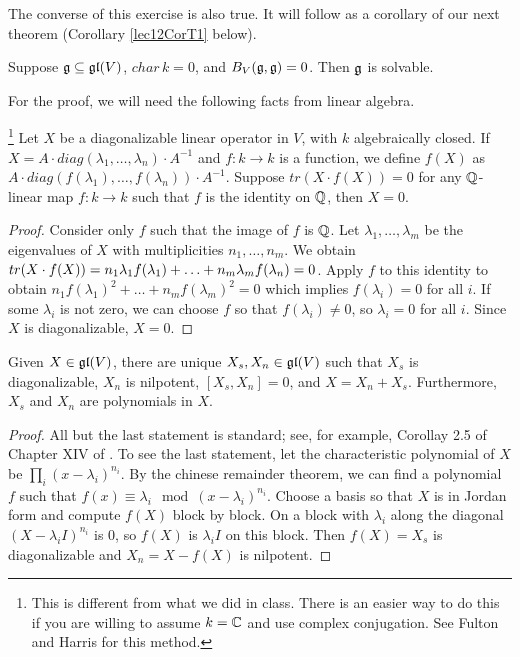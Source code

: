  The converse of this exercise is also true.  It will follow as a corollary
 of our next theorem (Corollary \ref{lec12CorT1} below).
 \begin{theorem}\label{lec12T1}
   Suppose $\mathfrak{g}\subseteq \mathfrak{gl}(V)$, $char\, k=0$, and $B_V(\mathfrak{g},\mathfrak{g})=0$. Then $\mathfrak{g}$ is solvable.
 \end{theorem}
 For the proof, we will need the following facts from linear algebra.
 \begin{lemma}\label{lec12L1}\hspace*{-1em}
   \footnote{This is different from what we did in class.  There is an easier way
   to do this if you are willing to assume $k = \mathbb{C}$ and use complex conjugation.  See
   Fulton and Harris for this method.} Let $X$ be a diagonalizable linear operator in
   $V$, with $k$ algebraically closed. If $X=A\cdot diag(\lambda_1,\dots,
   \lambda_n)\cdot A^{-1}$ and $f:k\to k$ is a function, we define $f(X)$ as $A\cdot
   diag(f(\lambda_1),\dots, f(\lambda_n))\cdot A^{-1}$. Suppose $tr (X \cdot f(X))=0$
   for any $\mathbb{Q}$-linear map $f:k \rightarrow k$ such that $f$ is the identity on
   $\mathbb{Q}$, then $X=0$.
 \end{lemma}
 \begin{proof}
   Consider only $f$ such that the image of $f$ is $\mathbb{Q}$. Let
   $\lambda_1,\dots, \lambda_m$ be the eigenvalues of $X$ with multiplicities
   $n_1,\dots, n_m$.  We obtain $tr(X\cdot\nobreak f(X)) = n_1 \lambda_1 f(\lambda_1)+\ldots
   +n_m \lambda_m f(\lambda_n)=0$. Apply $f$ to this identity to obtain $n_1
   f(\lambda_1)^2+\ldots+n_m f(\lambda_m)^2=0$ which implies $f(\lambda_i)=0$ for all
   $i$. If some $\lambda_i$ is not zero, we can choose $f$ so that $f(\lambda_i) \neq
   0$, so $\lambda_i=0$ for all $i$. Since $X$ is diagonalizable, $X=0$.
 \end{proof}

 \begin{lemma}\label{lec12Ljordan}
   Given $X\in \mathfrak{gl}(V)$, there are unique $X_s, X_n\in \mathfrak{gl}(V)$ such that $X_s$ is
   diagonalizable, $X_n$ is nilpotent, $[X_s,X_n]=0$, and $X=X_n+X_s$.  Furthermore,
   $X_s$ and $X_n$ are polynomials in $X$.
 \end{lemma}
 \begin{proof}
   All but the last statement is standard; see, for example, Corollay 2.5 of Chapter
   XIV of \cite{Lang:Algebra}. To see the last statement, let the characteristic
   polynomial of $X$ be $\prod_i(x-\lambda_i)^{n_i}$. By the chinese remainder
   theorem, we can find a polynomial $f$ such that $f(x)\equiv \lambda_i \mod
   (x-\lambda_i)^{n_i}$. Choose a basis so that $X$ is in Jordan form and compute
   $f(X)$ block by block.  On a block with $\lambda_i$ along the diagonal
   $(X-\lambda_i I)^{n_i}$ is 0, so $f(X)$ is $\lambda_i I$ on this block. Then
   $f(X)=X_s$ is diagonalizable and $X_n=X-f(X)$ is nilpotent.
 \end{proof}

